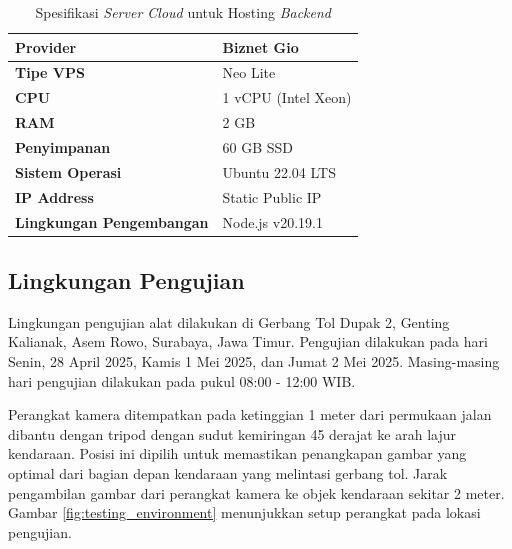 \begin{table}[htbp]
  \centering
  \caption{Spesifikasi \emph{Server Cloud} untuk Hosting \emph{Backend}}
  \label{tab:cloud_server_specs}
  \begin{tabular}{|l|l|}
  \hline
  \textbf{Provider} & Biznet Gio \\
  \hline
  \textbf{Tipe VPS} & Neo Lite \\
  \hline
  \textbf{CPU} & 1 vCPU (Intel Xeon) \\
  \hline
  \textbf{RAM} & 2 GB \\
  \hline
  \textbf{Penyimpanan} & 60 GB SSD \\
  \hline
  \textbf{Sistem Operasi} & Ubuntu 22.04 LTS \\
  \hline
  \textbf{IP Address} & Static Public IP \\
  \hline
  \textbf{Lingkungan Pengembangan} & Node.js v20.19.1  \\
  \hline
  \end{tabular}
\end{table}

\subsection{Lingkungan Pengujian}

Lingkungan pengujian alat dilakukan di Gerbang Tol Dupak 2, Genting Kalianak, Asem Rowo, Surabaya, Jawa Timur. Pengujian dilakukan pada hari Senin, 28 April 2025, Kamis 1 Mei 2025, dan Jumat 2 Mei 2025. Masing-masing hari pengujian dilakukan pada pukul 08:00 - 12:00 WIB. 

Perangkat kamera ditempatkan pada ketinggian 1 meter dari permukaan jalan dibantu dengan tripod dengan sudut kemiringan 45 derajat ke arah lajur kendaraan. Posisi ini dipilih untuk memastikan penangkapan gambar yang optimal dari bagian depan kendaraan yang melintasi gerbang tol. Jarak pengambilan gambar dari perangkat kamera ke objek kendaraan sekitar 2 meter. Gambar \ref{fig:testing_environment} menunjukkan setup perangkat pada lokasi pengujian.

